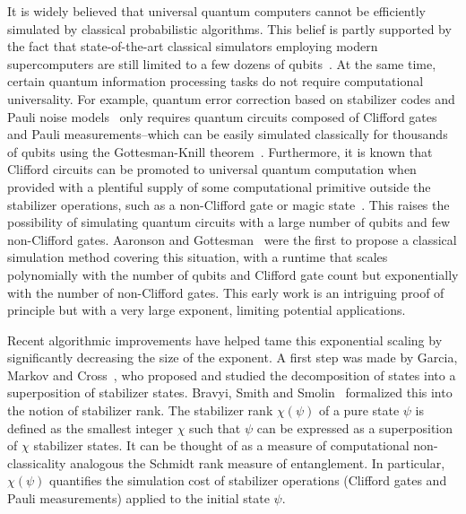 It is widely believed that universal quantum computers cannot be efficiently simulated by classical probabilistic algorithms. This belief is partly supported by the fact that
state-of-the-art classical simulators employing modern supercomputers are still limited to a few dozens of qubits~\cite{smelyanskiy2016qhipster,haner20170,pednault2017breaking,chen2018classical}.
At the same time, certain quantum information processing tasks do not require computational universality. For example, quantum error correction
based on stabilizer codes and Pauli noise models~\cite{gottesman1998theory} only requires quantum circuits composed of 
Clifford gates and Pauli measurements--which can be easily simulated  classically 
for thousands of qubits using the Gottesman-Knill theorem~\cite{aaronson04improved,anders2006fast}. Furthermore, it is known that Clifford circuits
can be promoted to universal quantum computation when provided with a plentiful supply of some computational primitive outside the stabilizer operations, such as a non-Clifford gate or magic state~\cite{bravyi2005universal}.  This raises the possibility of simulating quantum circuits with a large number of qubits and few non-Clifford gates.  Aaronson and Gottesman~\cite{aaronson04improved} were the first to propose a classical simulation method covering this situation, with a runtime that scales polynomially with the number of qubits and Clifford gate count but exponentially with the number of non-Clifford gates.  This early work is an intriguing proof of principle but with a very large exponent, limiting potential applications.   


Recent algorithmic improvements have helped tame this exponential scaling by significantly decreasing the size of the exponent.  A first step was made by Garcia, Markov and Cross~\cite{garcia2012efficient,Garcia14moreStabRank}, who proposed and studied the decomposition of states into a superposition of stabilizer states. Bravyi, Smith and Smolin~\cite{Bravyi16stabRank} formalized this into the notion of stabilizer rank. The stabilizer rank $\chi(\psi)$  of 
 a pure state $\psi$ is defined as the smallest integer  $\chi$ such that $\psi$
 can be expressed  as a superposition of $\chi$ stabilizer states. 
It can be thought of as a measure of computational non-classicality analogous the Schmidt rank measure of entanglement.  In particular,  $\chi(\psi)$ quantifies the simulation cost of 
stabilizer operations (Clifford gates and Pauli measurements) applied to the initial state  $\psi$. 

